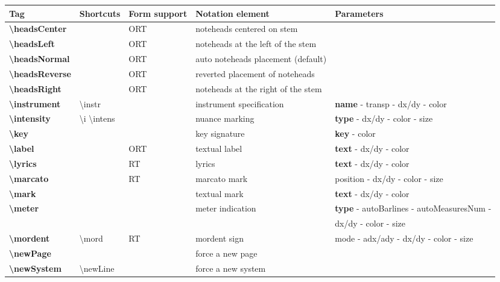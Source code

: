 \documentclass[a4paper, landscape, 10pt]{article}
\begin{document}
\begin{tabularx}{\linewidth}{p{3cm}p{4.5cm}p{3cm}p{5.5cm}l}
    \hline
    \textbf{Tag}&\textbf{Shortcuts}&\textbf{Form support}&\textbf{Notation element}&\textbf{Parameters}\\
    \hline
    \textbf{\textbackslash{}headsCenter}&&ORT&noteheads centered on stem&\\
    \hline
    \textbf{\textbackslash{}headsLeft}&&ORT&noteheads at the left of the stem&\\
    \hline
    \textbf{\textbackslash{}headsNormal}&&ORT&auto noteheads placement (default)&\\
    \hline
    \textbf{\textbackslash{}headsReverse}&&ORT&reverted placement of noteheads&\\
    \hline
    \textbf{\textbackslash{}headsRight}&&ORT&noteheads at the right of the stem&\\
    \hline
    \textbf{\textbackslash{}instrument}&\textbackslash{}instr&&instrument specification&\textbf{name} - transp - dx/dy - color\\
    \hline
    \textbf{\textbackslash{}intensity}&\textbackslash{}i \textbackslash{}intens&&nuance marking&\textbf{type} - dx/dy - color - size\\
    \hline
    \textbf{\textbackslash{}key}&&&key signature&\textbf{key} - color\\
    \hline
    \textbf{\textbackslash{}label}&&ORT&textual label&\textbf{text} - dx/dy - color\\
    \hline
    \textbf{\textbackslash{}lyrics}&&RT&lyrics&\textbf{text} - dx/dy - color\\
    \hline
    \textbf{\textbackslash{}marcato}&&RT&marcato mark&position - dx/dy - color - size\\
    \hline
    \textbf{\textbackslash{}mark}&&&textual mark&\textbf{text} - dx/dy - color\\
    \hline
    \textbf{\textbackslash{}meter}&&&meter indication&\textbf{type} - autoBarlines - autoMeasuresNum - \\
        &&&&dx/dy - color - size\\
    \hline
    \textbf{\textbackslash{}mordent}&\textbackslash{}mord&RT&mordent sign&mode - adx/ady - dx/dy - color - size\\
    \hline
    \textbf{\textbackslash{}newPage}&&&force a new page&\\
    \hline
    \textbf{\textbackslash{}newSystem}&\textbackslash{}newLine&&force a new system&\\

\end{tabularx}
\end{document}
